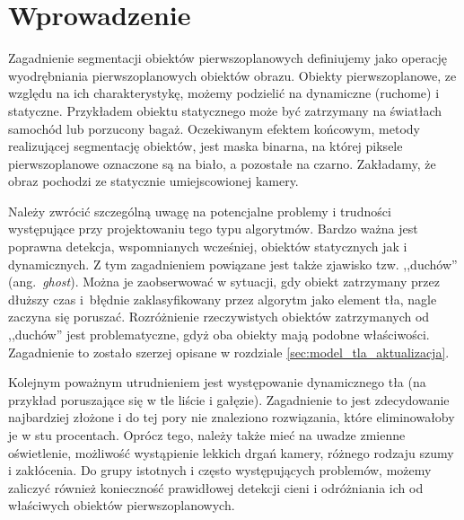 \chapter{Wprowadzenie}
\label{cha:wprowadzenie}


Zagadnienie segmentacji obiektów pierwszoplanowych definiujemy jako operację wyodrębniania pierwszoplanowych obiektów obrazu. Obiekty pierwszoplanowe, ze względu na ich charakterystykę, możemy podzielić na dynamiczne (ruchome) i statyczne. Przykładem obiektu statycznego może być zatrzymany na światłach samochód lub porzucony bagaż.
Oczekiwanym efektem końcowym, metody realizującej segmentację obiektów, jest maska binarna, na której piksele pierwszoplanowe oznaczone są na biało, a pozostałe na czarno. Zakładamy, że obraz pochodzi ze statycznie umiejscowionej kamery. 

Należy zwrócić szczególną uwagę na potencjalne problemy i trudności występujące przy projektowaniu tego typu algorytmów. 
Bardzo ważna jest poprawna detekcja, wspomnianych wcześniej, obiektów statycznych jak i dynamicznych. 
Z tym zagadnieniem powiązane jest także zjawisko tzw. ,,duchów'' (ang.~\textit{ghost}). 
Można je zaobserwować w sytuacji, gdy obiekt zatrzymany przez dłuższy czas i~błędnie zaklasyfikowany przez algorytm jako element tła, nagle zaczyna się poruszać. 
Rozróżnienie rzeczywistych obiektów zatrzymanych od ,,duchów'' jest problematyczne, gdyż oba obiekty mają podobne właściwości. Zagadnienie to zostało szerzej opisane w rozdziale \ref{sec:model_tla_aktualizacja}.

Kolejnym poważnym utrudnieniem jest występowanie dynamicznego tła (na przykład poruszające się w tle liście i gałęzie). 
Zagadnienie to jest zdecydowanie najbardziej złożone i do tej pory nie znaleziono rozwiązania, które eliminowałoby je w stu procentach.
Oprócz tego, należy także mieć na uwadze zmienne oświetlenie, możliwość wystąpienie lekkich drgań kamery, różnego rodzaju szumy i zakłócenia. 
Do grupy istotnych i często występujących problemów, możemy zaliczyć również konieczność prawidłowej detekcji cieni i odróżniania ich od właściwych obiektów pierwszoplanowych.

